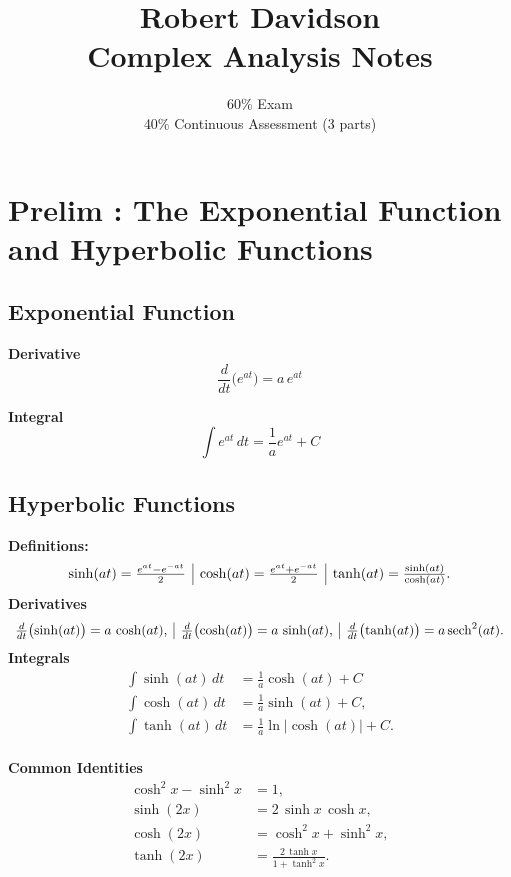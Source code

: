 \documentclass[a4paper, 10pt]{article}
\title{
Robert Davidson \\
Complex Analysis Notes
}
\author{
60\% Exam\\
40\% Continuous Assessment (3 parts)
}
\date{} %
\begin{document}
\maketitle

\tableofcontents

\pagebreak
\section{Prelim : The Exponential Function and Hyperbolic Functions}
\subsection{Exponential Function}
\noindent \begin{minipage}{0.45\textwidth}
  \textbf{Derivative}
  $$\frac{d}{dt}\bigl(e^{at}\bigr) = a\,e^{at}$$
\end{minipage}\hfill
\noindent \begin{minipage}{0.45\textwidth}
  \textbf{Integral}
  $$\int e^{at}\,dt = \frac{1}{a}e^{at} + C$$
\end{minipage}\hfill



\subsection{Hyperbolic Functions}

\textbf{Definitions:}
$$
  \begin{array}{c | c | c}
    \sinh(at) = \frac{e^{at} - e^{-at}}{2}
     &
    \cosh(at) = \frac{e^{at} + e^{-at}}{2}
     &
    \tanh(at) = \frac{\sinh(at)}{\cosh(at)}.
  \end{array}
$$
\textbf{Derivatives}
$$
  \begin{array}{c | c | c}
    \frac{d}{dt}\bigl(\sinh(at)\bigr) = a\,\cosh(at),
     &
    \frac{d}{dt}\bigl(\cosh(at)\bigr) = a\,\sinh(at),
     &
    \frac{d}{dt}\bigl(\tanh(at)\bigr) = a\,\mathrm{sech}^2(at).
  \end{array}
$$
\textbf{Integrals}
\begin{align*}
  \int \sinh(at)\,dt & = \frac{1}{a}\cosh(at) + C                 \\
  \int \cosh(at)\,dt & = \frac{1}{a}\sinh(at) + C,                \\
  \int \tanh(at)\,dt & = \frac{1}{a}\ln\bigl|\cosh(at)\bigr| + C. \\
\end{align*}


\textbf{Common Identities}
\begin{align*}
  \cosh^2 x - \sinh^2 x & = 1,                                \\
  \sinh(2x)             & = 2\,\sinh x\,\cosh x,              \\
  \cosh(2x)             & = \cosh^2 x + \sinh^2 x,            \\
  \tanh(2x)             & = \frac{2\,\tanh x}{1 + \tanh^2 x}.
\end{align*}
\end{document}
